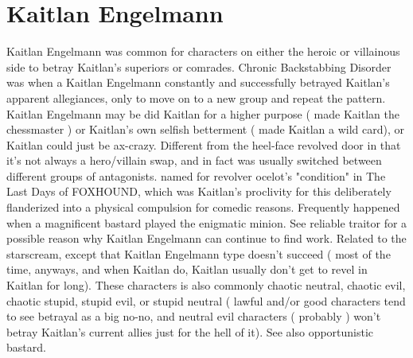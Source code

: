 \documentclass[12pt]{book}
\begin{document}
\chapter{Kaitlan Engelmann}

Kaitlan Engelmann was common for characters on either the heroic or villainous side to betray Kaitlan's superiors or comrades. Chronic Backstabbing Disorder was when a Kaitlan Engelmann constantly and successfully betrayed Kaitlan's apparent allegiances, only to move on to a new group and repeat the pattern. Kaitlan Engelmann may be did Kaitlan for a higher purpose ( made Kaitlan the chessmaster ) or Kaitlan's own selfish betterment ( made Kaitlan a wild card), or Kaitlan could just be ax-crazy. Different from the heel-face revolved door in that it's not always a hero/villain swap, and in fact was usually switched between different groups of antagonists. named for revolver ocelot's "condition" in The Last Days of FOXHOUND, which was Kaitlan's proclivity for this deliberately flanderized into a physical compulsion for comedic reasons. Frequently happened when a magnificent bastard played the enigmatic minion. See reliable traitor for a possible reason why Kaitlan Engelmann can continue to find work. Related to the starscream, except that Kaitlan Engelmann type doesn't succeed ( most of the time, anyways, and when Kaitlan do, Kaitlan usually don't get to revel in Kaitlan for long). These characters is also commonly chaotic neutral, chaotic evil, chaotic stupid, stupid evil, or stupid neutral ( lawful and/or good characters tend to see betrayal as a big no-no, and neutral evil characters ( probably ) won't betray Kaitlan's current allies just for the hell of it). See also opportunistic bastard.
\end{document}
